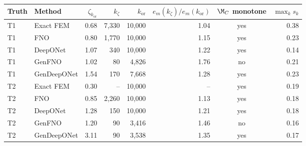 \begin{tabular}{llrrrrcr}
\toprule
Truth & Method & $\zeta_{k_{\mathrm{or}}}$ & $k_\zeta$ & $k_{\mathrm{or}}$ & $e_m(k_\zeta)/e_m(k_{\mathrm{or}})$ & $\M_C$ monotone & $\max_k s_k$ \\
\midrule
T1 & Exact FEM & 0.68 & 7,330 & 10,000 & 1.04 & yes & 0.38 \\
T1 & FNO & 0.80 & 1,770 & 10,000 & 1.15 & yes & 0.23 \\
T1 & DeepONet & 1.07 & 340 & 10,000 & 1.22 & yes & 0.14 \\
T1 & GenFNO & 1.02 & 80 & 4,826 & 1.76 & no & 0.21 \\
T1 & GenDeepONet & 1.54 & 170 & 7,668 & 1.28 & yes & 0.23 \\
\midrule
T2 & Exact FEM & 0.30 & -- & 10,000 & -- & yes & 0.19 \\
T2 & FNO & 0.85 & 2,260 & 10,000 & 1.13 & yes & 0.18 \\
T2 & DeepONet & 1.28 & 150 & 10,000 & 1.21 & yes & 0.18 \\
T2 & GenFNO & 1.20 & 90 & 3,416 & 1.46 & no & 0.16 \\
T2 & GenDeepONet & 3.11 & 90 & 3,538 & 1.35 & yes & 0.17 \\
\bottomrule
\end{tabular}
